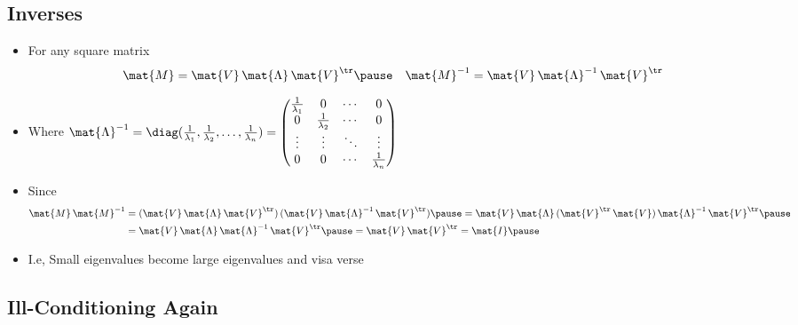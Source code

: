 
\begin{slide}
\section[-2]{Inverses}

\begin{PauseHighLight}
  \begin{itemize}
  \item For any square matrix
    \begin{align*}
      \mat{M} &=\mat{V}\,\mat{\Lambda}\,\mat{V}^\tr \pause &
      \mat{M}^{-1} &=\mat{V}\,\mat{\Lambda}^{-1}\,\mat{V}^\tr
    \end{align*}
  \item Where $\mat{\Lambda}^{-1} = \diag(\tfrac{1}{\lambda_1},
    \tfrac{1}{\lambda_2}, \ldots, \tfrac{1}{\lambda_n}) =
    \begin{pmatrix}
      \tfrac{1}{\lambda_1} & 0 & \cdots & 0 \\
      0 & \tfrac{1}{\lambda_2}  & \cdots & 0 \\
      \vdots & \vdots &\ddots &\vdots \\
      0 & 0 & \cdots & \tfrac{1}{\lambda_n}
    \end{pmatrix}$\pause
  \item Since
    \begin{align*}
       \mat{M}\,\mat{M}^{-1} &= (\mat{V}\,\mat{\Lambda}\,\mat{V}^\tr)\,
       (\mat{V}\,\mat{\Lambda}^{-1}\,\mat{V}^\tr)\pause
       = \mat{V}\,\mat{\Lambda}\,(\mat{V}^\tr\,
       \mat{V})\,\mat{\Lambda}^{-1}\,\mat{V}^\tr\pause \\
       &= \mat{V}\,\mat{\Lambda}\,\mat{\Lambda}^{-1}\,\mat{V}^\tr\pause
       = \mat{V}\,\mat{V}^\tr = \mat{I}\pause
    \end{align*}
  \item I.e, Small eigenvalues become large eigenvalues and visa verse\pause
  \end{itemize}
\end{PauseHighLight}

\end{slide}


\begin{slide}
\section[-1.5]{Ill-Conditioning Again}

\pb\pause{}
\begin{center}
  \pause
\end{center}

\end{slide}

